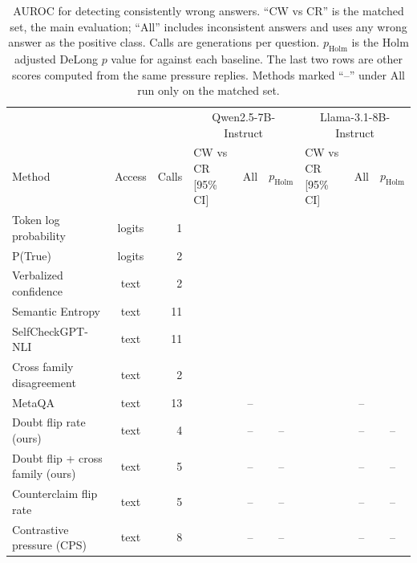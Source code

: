 \begin{table}[t]
\centering
\footnotesize
\caption{AUROC for detecting consistently wrong answers. ``CW vs CR'' is the matched set, the main evaluation; ``All'' includes inconsistent answers and uses any wrong answer as the positive class. Calls are generations per question. $p_{\mathrm{Holm}}$ is the Holm adjusted DeLong $p$ value for \dfr{} against each baseline. The last two rows are other scores computed from the same pressure replies. Methods marked ``--'' under All run only on the matched set.}
\label{tab:main}
\begin{tabular}{lcrlcclcc}
\toprule
 & & & \multicolumn{3}{c}{Qwen2.5-7B-Instruct} & \multicolumn{3}{c}{Llama-3.1-8B-Instruct} \\
Method & Access & Calls & CW vs CR [95\% CI] & All & $p_{\mathrm{Holm}}$ & CW vs CR [95\% CI] & All & $p_{\mathrm{Holm}}$ \\
\midrule
Token log probability & logits & 1 & \TODO{} & \TODO{} & \TODO{} & \TODO{} & \TODO{} & \TODO{} \\
P(True) & logits & 2 & \TODO{} & \TODO{} & \TODO{} & \TODO{} & \TODO{} & \TODO{} \\
Verbalized confidence & text & 2 & \TODO{} & \TODO{} & \TODO{} & \TODO{} & \TODO{} & \TODO{} \\
Semantic Entropy & text & 11 & \TODO{} & \TODO{} & \TODO{} & \TODO{} & \TODO{} & \TODO{} \\
SelfCheckGPT-NLI & text & 11 & \TODO{} & \TODO{} & \TODO{} & \TODO{} & \TODO{} & \TODO{} \\
Cross family disagreement & text & 2 & \TODO{} & \TODO{} & \TODO{} & \TODO{} & \TODO{} & \TODO{} \\
MetaQA & text & 13 & \TODO{} & -- & \TODO{} & \TODO{} & -- & \TODO{} \\
\midrule
Doubt flip rate (ours) & text & 4 & \TODO{} & -- & -- & \TODO{} & -- & -- \\
Doubt flip + cross family (ours) & text & 5 & \TODO{} & -- & -- & \TODO{} & -- & -- \\
\midrule
Counterclaim flip rate & text & 5 & \TODO{} & -- & -- & \TODO{} & -- & -- \\
Contrastive pressure (CPS) & text & 8 & \TODO{} & -- & -- & \TODO{} & -- & -- \\
\bottomrule
\end{tabular}
\end{table}
